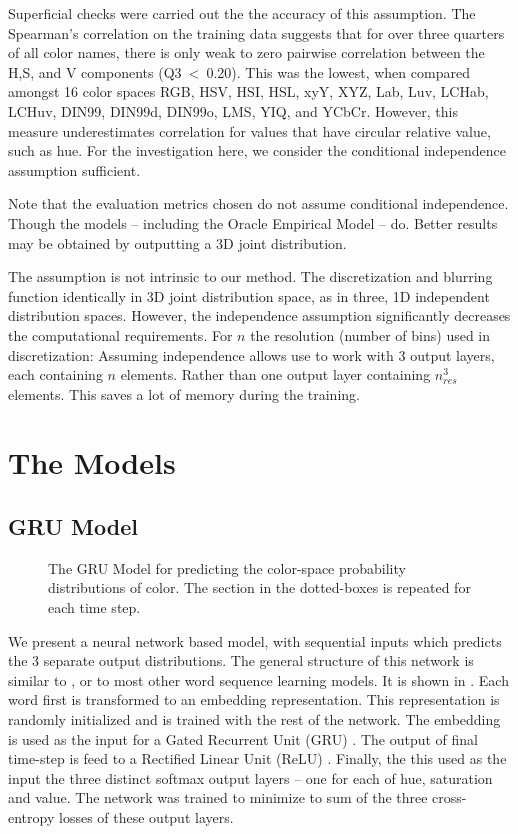\documentclass[11pt,letterpaper]{article}
\newcommand{\parencite}{\cite}
\begin{document}
Superficial checks were carried out the the accuracy of this assumption.
The Spearman's correlation on the training data suggests that for over three quarters of all color names, there is only weak to zero pairwise correlation between the H,S, and V components (\mbox{Q3 < 0.20}).
This was the lowest, when compared amongst 16 color spaces RGB, HSV, HSI, HSL, xyY, XYZ, Lab, Luv, LCHab, LCHuv, DIN99, DIN99d, DIN99o, LMS, YIQ, and YCbCr.
However, this measure underestimates correlation for values that have circular relative value, such as hue.
For the investigation here, we consider the conditional independence assumption sufficient.



Note that the evaluation metrics chosen do not assume conditional independence.
Though the models -- including the Oracle Empirical Model -- do.
Better results may be obtained by outputting a 3D joint distribution.

The assumption is not intrinsic to our method.
The discretization and blurring function identically in 3D joint distribution space,
as in three, 1D independent distribution spaces.
However, the independence assumption significantly decreases the computational requirements.
For $n$ the resolution (number of bins) used in discretization:
Assuming independence allows use to work with 3 output layers, each containing $n$ elements.
Rather than one output layer containing $n_{res}^3$ elements.
This saves a lot of memory during the training.


\section{The Models}

\subsection{GRU Model}

\begin{figure}
	\resizebox{\columnwidth}{!}{	}

	\caption{\label{network}
		The GRU Model for predicting the color-space probability distributions of color.
		The section in the dotted-boxes is repeated for each time step.
		}
\end{figure}

We present a neural network based model, with sequential inputs which predicts the 3 separate output distributions. The general structure of this network is similar to \cite{2016arXiv160603821M}, or to most other word sequence learning models.
It is shown in .
Each word first is transformed to an embedding representation.
This representation is randomly initialized and is trained with the rest of the network.
The embedding is used as the input for a Gated Recurrent Unit (GRU) \parencite{cho2014properties,chung2014empirical}.
The output of final time-step is feed to a Rectified Linear Unit (ReLU) \parencite{dahl2013reludropout}.
Finally, the this used as the input the three distinct softmax output layers -- one for each of hue, saturation and value.
The network was trained to minimize to sum of the three cross-entropy losses of these output layers.
\end{document}
